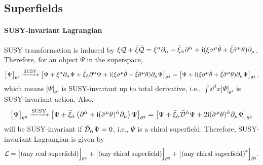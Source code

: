 \documentclass[CheatSheet]{subfiles}
\begin{document}
\subsection{Superfields}
\paragraph{SUSY-invariant Lagrangian}
SUSY transformation is induced by $\xi {\mathcal Q} + \bar\xi\bar {\mathcal Q} = \xi^\alpha\partial_\alpha + \bar\xi_{\dot\alpha}\partial^{{\dot\alpha}} + {\mathrm{i}}(\xi\sigma^\mu\bar\theta+\bar\xi\bar\sigma^\mu\theta)\partial_\mu$.
Therefore, for an object $\Psi$ in the superspace,
\begin{equation}
 \bigl[\Psi\bigr]_{\theta^4}\xrightarrow{\text{SUSY}}
 \left[\Psi + \xi^\alpha\partial_\alpha\Psi + \bar\xi_{\dot\alpha}\partial^{{\dot\alpha}}\Psi + {\mathrm{i}}(\xi\sigma^\mu\bar\theta+\bar\xi\bar\sigma^\mu\theta)\partial_\mu\Psi\right]_{\theta^4}
=
 \left[\Psi +
{\mathrm{i}}(\xi\sigma^\mu\bar\theta+\bar\xi\bar\sigma^\mu\theta)\partial_\mu\Psi\right]_{\theta^4},
\end{equation}
which means $\bigl[\Psi\bigr]_{\theta^4}$ is SUSY-invariant up to total derivative, i.e., $\int\dd^4x \bigl[\Psi\bigr]_{\theta^4}$ is SUSY-invariant action. Also,
\begin{equation}
  \bigl[\Psi\bigr]_{\theta^2}\xrightarrow{\text{SUSY}}
 \left[\Psi + \bar\xi_{\dot\alpha}\left(\partial^{{\dot\alpha}} + {\mathrm{i}}(\bar\sigma^{\mu}\theta)^{\dot\alpha}\partial_\mu\right)\Psi\right]_{\theta^2}
=\left[\Psi + \bar\xi_{\dot\alpha}\bar {\mathcal D}^{\dot\alpha}\Psi+2{\mathrm{i}}(\bar\sigma^{\mu}\theta)^{\dot\alpha}\partial_\mu\Psi\right]_{\theta^2}
\end{equation}
will be SUSY-invariant if $\bar {\mathcal D}_{\dot\alpha}\Psi=0$, i.e., $\Psi$ is a chiral superfield. Therefore, SUSY-invariant Lagrangian is given by
\begin{equation}
 \mathcal L = \bigl[\text{(any real superfield)}\Bigr]_{\theta^4} + \bigl[\text{(any chiral superfield)}\Bigr]_{\theta^2} + \bigl[\text{(any chiral superfield)}^*\Bigr]_{\bar\theta^2}.
\label{eq:susy-inv}
\end{equation}
\end{document}
